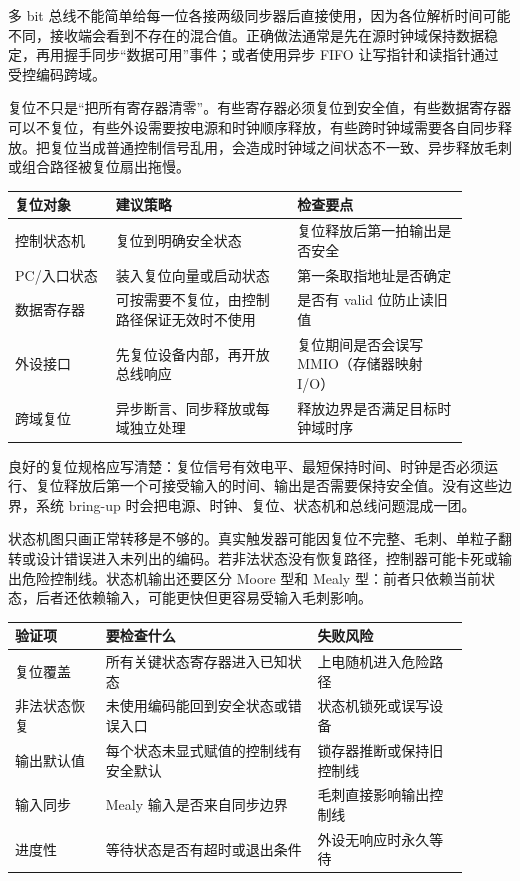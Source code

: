 多 bit 总线不能简单给每一位各接两级同步器后直接使用，因为各位解析时间可能不同，接收端会看到不存在的混合值。正确做法通常是先在源时钟域保持数据稳定，再用握手同步“数据可用”事件；或者使用异步 FIFO 让写指针和读指针通过受控编码跨域。

复位不只是“把所有寄存器清零”。有些寄存器必须复位到安全值，有些数据寄存器可以不复位，有些外设需要按电源和时钟顺序释放，有些跨时钟域需要各自同步释放。把复位当成普通控制信号乱用，会造成时钟域之间状态不一致、异步释放毛刺或组合路径被复位扇出拖慢。

\begin{longtable}{L{0.2\linewidth}L{0.36\linewidth}L{0.34\linewidth}}
\toprule
复位对象 & 建议策略 & 检查要点 \\
\midrule
控制状态机 & 复位到明确安全状态 & 复位释放后第一拍输出是否安全 \\
PC/入口状态 & 装入复位向量或启动状态 & 第一条取指地址是否确定 \\
数据寄存器 & 可按需要不复位，由控制路径保证无效时不使用 & 是否有 valid 位防止读旧值 \\
外设接口 & 先复位设备内部，再开放总线响应 & 复位期间是否会误写 MMIO（存储器映射 I/O） \\
跨域复位 & 异步断言、同步释放或每域独立处理 & 释放边界是否满足目标时钟域时序 \\
\bottomrule
\end{longtable}

良好的复位规格应写清楚：复位信号有效电平、最短保持时间、时钟是否必须运行、复位释放后第一个可接受输入的时间、输出是否需要保持安全值。没有这些边界，系统 bring-up 时会把电源、时钟、复位、状态机和总线问题混成一团。

状态机图只画正常转移是不够的。真实触发器可能因复位不完整、毛刺、单粒子翻转或设计错误进入未列出的编码。若非法状态没有恢复路径，控制器可能卡死或输出危险控制线。状态机输出还要区分 Moore 型和 Mealy 型：前者只依赖当前状态，后者还依赖输入，可能更快但更容易受输入毛刺影响。

\begin{longtable}{L{0.18\linewidth}L{0.42\linewidth}L{0.3\linewidth}}
\toprule
验证项 & 要检查什么 & 失败风险 \\
\midrule
复位覆盖 & 所有关键状态寄存器进入已知状态 & 上电随机进入危险路径 \\
非法状态恢复 & 未使用编码能回到安全状态或错误入口 & 状态机锁死或误写设备 \\
输出默认值 & 每个状态未显式赋值的控制线有安全默认 & 锁存器推断或保持旧控制线 \\
输入同步 & Mealy 输入是否来自同步边界 & 毛刺直接影响输出控制线 \\
进度性 & 等待状态是否有超时或退出条件 & 外设无响应时永久等待 \\
\bottomrule
\end{longtable}

